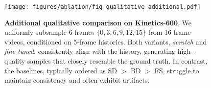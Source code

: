 \begin{figure}[t]
    \centering
    \texttt{[image: figures/ablation/fig\_qualitative\_additional.pdf]}
    \caption{
        \textbf{Additional qualitative comparison on Kinetics-600}. We uniformly
        subsample 6 frames $\{0, 3, 6, 9, 12, 15\}$ from 16-frame videos, conditioned on 5-frame histories. Both \mtd variants, \emph{scratch} and \emph{fine-tuned}, consistently align with the history, generating high-quality samples that closely resemble the ground truth. In contrast, the baselines, typically ordered as SD $>$ BD $>$ FS, struggle to maintain consistency and often exhibit artifacts.
    }
    \label{fig:comparison_qualitative_additional}
\end{figure}
